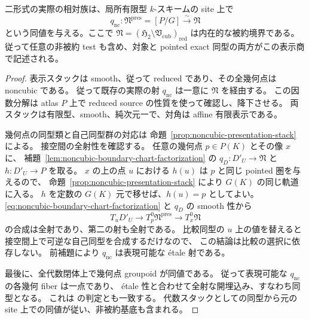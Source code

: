 \begin{theorem}[二形式表示は内在的被約境界を表す]
\label{thm:noncubic-intrinsic-presentation-equivalence}
二形式の実際の相対族は、局所有限型 $k$-スキームの site 上で
\[
 q_{\mathrm{nc}}:\mathfrak N^{\mathrm{pres}}=[P/G]
  \xrightarrow{\ \sim\ }\mathfrak N
\]
という同値を与える。ここで
$\mathfrak N=(\mathfrak H_2\setminus\mathfrak V_{\mathrm{cub}})_{\mathrm{red}}$
は内在的な被約境界である。従って任意の非被約 test も含め、対象と
pointed exact 同型の両方がこの表示商で記述される。
\end{theorem}
\begin{proof}
表示スタックは smooth、従って reduced であり、その全幾何点は noncubic である。
従って既存の実際の射 $q_{\mathrm{nc}}$ は一意に $\mathfrak N$ を経由する。
この因数分解は atlas $P$ 上で reduced source の性質を使って確認し、降下させる。
両スタックは有限型、smooth、純次元一で、対角は affine 有限表示である。

幾何点の同型類と自己同型群の対応は
命題~\ref{prop:noncubic-presentation-stack} による。
接空間の全射性を確認する。
任意の幾何点 $p\in P(K)$ とその像 $x$ に、
補題~\ref{lem:noncubic-boundary-chart-factorization} の
$q_D:D'_U\to\mathfrak N$ と $h:D'_U\to P$ を取る。
$x$ の上の点 $u$ における $h(u)$ は $p$ と同じ pointed 圏を与えるので、
命題~\ref{prop:noncubic-presentation-stack} により $G(K)$ の同じ軌道に入る。
$h$ を定数の $G(K)$ 元で移せば、$h(u)=p$ としてよい。
\eqref{eq:noncubic-boundary-chart-factorization} と $q_D$ の smooth 性から
\[
 T_uD'_U\longrightarrow T^0_p\mathfrak N^{\mathrm{pres}}
 \longrightarrow T^0_x\mathfrak N
\]
の合成は全射であり、第二の射も全射である。
比較同型の $u$ 上の値を替えると接空間上で可逆な自己同型を合成するだけなので、
この結論は比較の選択に依存しない。
前補題により $q_{\mathrm{nc}}$ は表現可能な \texorpdfstring{\'etale}{etale} 射である。

最後に、全代数閉体上で幾何点 groupoid が同値である。
従って表現可能な $q_{\mathrm{nc}}$ の各幾何 fiber は一点であり、
\texorpdfstring{\'etale}{etale} 性と合わせて全射な開埋込み、すなわち同型となる。
これは \cite[Tag 0DUD, Lemma 101.45.7]{StacksBoundaryComparison} の判定とも一致する。
代数スタックとしての同型から元の site 上での同値が従い、非被約基底も含まれる。
\end{proof}

